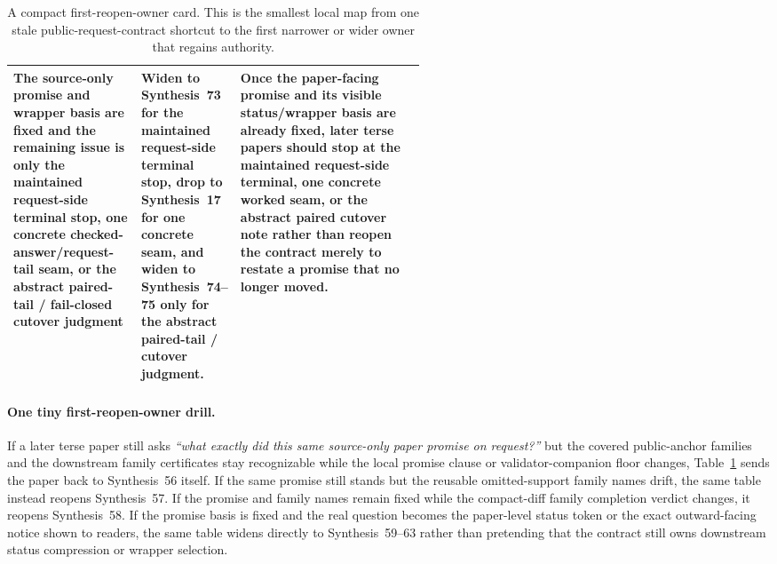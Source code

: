 \documentclass[11pt]{article}
\begin{document}
\begin{table}[t]
\begin{tabularx}{\linewidth}{@{}p{0.31\linewidth}p{0.23\linewidth}X@{}}
The source-only promise and wrapper basis are fixed and the remaining issue is only the maintained request-side terminal stop, one concrete checked-answer/request-tail seam, or the abstract paired-tail / fail-closed cutover judgment & Widen to Synthesis~73 for the maintained request-side terminal stop, drop to Synthesis~17 for one concrete seam, and widen to Synthesis~74--75 only for the abstract paired-tail / cutover judgment. & Once the paper-facing promise and its visible status/wrapper basis are already fixed, later terse papers should stop at the maintained request-side terminal, one concrete worked seam, or the abstract paired cutover note rather than reopen the contract merely to restate a promise that no longer moved. \\
\bottomrule
\end{tabularx}
\caption{A compact first-reopen-owner card. This is the smallest local map from one stale public-request-contract shortcut to the first narrower or wider owner that regains authority.}
\label{tab:first-reopen-owner-card-public-request-contract}
\end{table}

\paragraph{One tiny first-reopen-owner drill.}
If a later terse paper still asks \emph{``what exactly did this same source-only paper promise on request?''} but the covered public-anchor families and the downstream family certificates stay recognizable while the local promise clause or validator-companion floor changes, Table~\ref{tab:first-reopen-owner-card-public-request-contract} sends the paper back to Synthesis~56 itself. If the same promise still stands but the reusable omitted-support family names drift, the same table instead reopens Synthesis~57. If the promise and family names remain fixed while the compact-diff family completion verdict changes, it reopens Synthesis~58. If the promise basis is fixed and the real question becomes the paper-level status token or the exact outward-facing notice shown to readers, the same table widens directly to Synthesis~59--63 rather than pretending that the contract still owns downstream status compression or wrapper selection.\cite{series:workedexample,series:publicrequeststatusenvelopes,series:publicrequestcarryforward,series:publicrequestnotices,series:publicrequestnoticenormalforms,series:publicrequestnoticeselections,series:requestsideterminalcitationnormalform,series:pairedterminalcitationdiscipline,series:pairedterminalcutoverrules}
\end{document}

